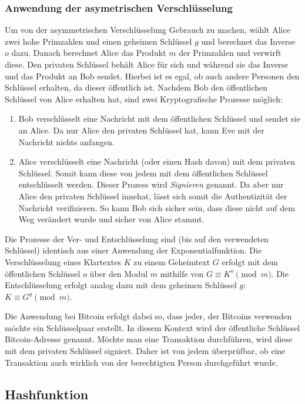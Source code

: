 \subsubsection{Anwendung der asymetrischen Verschlüsselung}

Um von der asymmetrischen Verschlüsselung Gebrauch zu machen, wählt Alice zwei hohe Primzahlen und einen geheimen Schlüssel $g$ und berechnet das Inverse $o$ dazu.
Danach berechnet Alice das Produkt $m$ der Primzahlen und verwirft diese.
Den privaten Schlüssel behält Alice für sich und während sie das Inverse und das Produkt an Bob sendet.
Hierbei ist es egal, ob auch andere Personen den Schlüssel erhalten, da dieser öffentlich ist.
Nachdem Bob den öffentlichen Schlüssel von Alice erhalten hat, sind zwei Kryptografische Prozesse möglich:
\begin{enumerate}
    \item Bob verschlüsselt eine Nachricht mit dem öffentlichen Schlüssel und sendet sie an Alice.
    Da nur Alice den privaten Schlüssel hat, kann Eve mit der Nachricht nichts anfangen.
    \item Alice verschlüsselt eine Nachricht (oder einen Hash davon) mit dem privaten Schlüssel.
    Somit kann diese von jedem mit dem öffentlichen Schlüssel entschlüsselt werden.
    Dieser Prozess wird \emph{Signieren} genannt.
    Da aber nur Alice den privaten Schlüssel innehat, lässt sich somit die Authentizität der Nachricht verifizieren.
    So kann Bob sich sicher sein, dass diese nicht auf dem Weg verändert wurde und sicher von Alice stammt.
\end{enumerate}

Die Prozesse der Ver- und Entschlüsselung sind (bis auf den verwendeten Schlüssel) identisch aus einer Anwendung der Exponentialfunktion.
Die Verschlüsselung eines Klartextes $K$ zu einem Geheimtext $G$ erfolgt mit dem öffentlichen Schlüssel $o$ über den Modul $m$ mithilfe von $G \equiv K^o \pmod{m}$.
Die Entschlüsselung erfolgt analog dazu mit dem geheimen Schlüssel $g$: $K \equiv G^g \pmod{m}$.

Die Anwendung bei Bitcoin erfolgt dabei so, dass jeder, der Bitcoins verwenden möchte ein Schlüsselpaar erstellt.
In diesem Kontext wird der öffentliche Schlüssel Bitcoin-Adresse genannt.
Möchte man eine Transaktion durchführen, wird diese mit dem privaten Schlüssel signiert.
Daher ist von jedem überprüfbar, ob eine Transaktion auch wirklich von der berechtigten Person durchgeführt wurde.

\subsection{Hashfunktion}

